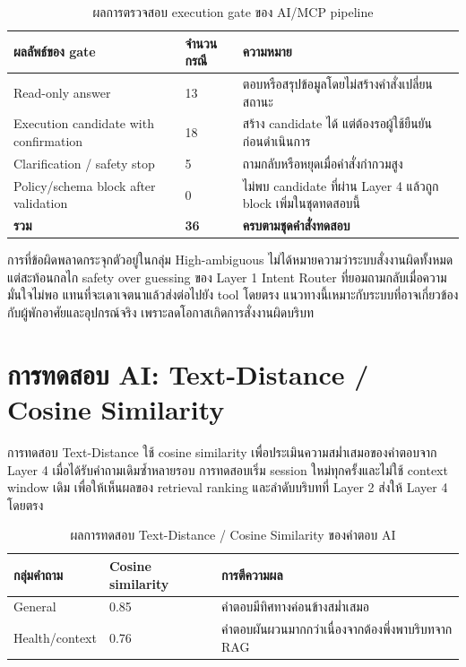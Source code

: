 \begin{table}[!htbp]
    \centering
    \caption{ผลการตรวจสอบ execution gate ของ AI/MCP pipeline}
    \label{tab:ch4_ai_execution_gate}
    \renewcommand{\arraystretch}{1.18}
    \small
    \setlength{\tabcolsep}{3pt}
    \begin{tabular}{|L{0.36\textwidth}|L{0.16\textwidth}|L{0.38\textwidth}|}
        \hline
        \textbf{ผลลัพธ์ของ gate} & \textbf{จำนวนกรณี} & \textbf{ความหมาย} \\ \hline
        Read-only answer & 13 & ตอบหรือสรุปข้อมูลโดยไม่สร้างคำสั่งเปลี่ยนสถานะ \\ \hline
        Execution candidate with confirmation & 18 & สร้าง candidate ได้ แต่ต้องรอผู้ใช้ยืนยันก่อนดำเนินการ \\ \hline
        Clarification / safety stop & 5 & ถามกลับหรือหยุดเมื่อคำสั่งกำกวมสูง \\ \hline
        Policy/schema block after validation & 0 & ไม่พบ candidate ที่ผ่าน Layer 4 แล้วถูก block เพิ่มในชุดทดสอบนี้ \\ \hline
        \textbf{รวม} & \textbf{36} & \textbf{ครบตามชุดคำสั่งทดสอบ} \\ \hline
    \end{tabular}
\end{table}

การที่ข้อผิดพลาดกระจุกตัวอยู่ในกลุ่ม High-ambiguous ไม่ได้หมายความว่าระบบสั่งงานผิดทั้งหมด แต่สะท้อนกลไก safety over guessing ของ Layer 1 Intent Router ที่ยอมถามกลับเมื่อความมั่นใจไม่พอ แทนที่จะเดาเจตนาแล้วส่งต่อไปยัง tool โดยตรง แนวทางนี้เหมาะกับระบบที่อาจเกี่ยวข้องกับผู้พักอาศัยและอุปกรณ์จริง เพราะลดโอกาสเกิดการสั่งงานผิดบริบท
\FloatBarrier

\section{การทดสอบ AI: Text-Distance / Cosine Similarity}
\label{sec:ch4_ai_cosine}
การทดสอบ Text-Distance ใช้ cosine similarity เพื่อประเมินความสม่ำเสมอของคำตอบจาก Layer 4 เมื่อได้รับคำถามเดิมซ้ำหลายรอบ การทดสอบเริ่ม session ใหม่ทุกครั้งและไม่ใช้ context window เดิม เพื่อให้เห็นผลของ retrieval ranking และลำดับบริบทที่ Layer 2 ส่งให้ Layer 4 โดยตรง

\begin{table}[!htbp]
    \centering
    \caption{ผลการทดสอบ Text-Distance / Cosine Similarity ของคำตอบ AI}
    \label{tab:ch4_ai_cosine}
    \renewcommand{\arraystretch}{1.18}
    \small
    \setlength{\tabcolsep}{3pt}
    \begin{tabular}{|L{0.30\textwidth}|L{0.20\textwidth}|L{0.40\textwidth}|}
        \hline
        \textbf{กลุ่มคำถาม} & \textbf{Cosine similarity} & \textbf{การตีความผล} \\ \hline
        General & 0.85 & คำตอบมีทิศทางค่อนข้างสม่ำเสมอ \\ \hline
        Health/context & 0.76 & คำตอบผันผวนมากกว่าเนื่องจากต้องพึ่งพาบริบทจาก RAG \\ \hline
    \end{tabular}
\end{table}

